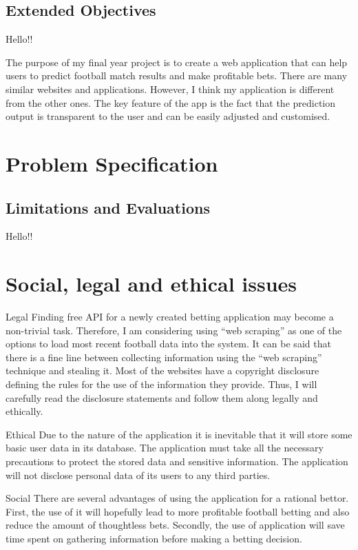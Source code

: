 \subsection{Extended Objectives}
\label{sec:extendedobjectives}
Hello!!


The purpose of my final year project is to create a web application that can help users to predict football match results and make profitable bets. There are many similar websites and applications. However, I think my application is different from the other ones. The key feature of the app is the fact that the prediction output is transparent to the user and can be easily adjusted and customised. 

\section{Problem Specification}
\label{sec:projscpec}


\subsection{Limitations and Evaluations}
\label{sec:limiteval}
Hello!!

\section{Social, legal and ethical issues}
Legal
Finding free API for a newly created betting application may become a non-trivial task. Therefore, I am considering using “web scraping” as one of the options to load most recent football data into the system. It can be said that there is a fine line between collecting information using the “web scraping” technique and stealing it. Most of the websites have a copyright disclosure defining the rules for the use of the information they provide. Thus, I will carefully read the disclosure statements and follow them along legally and ethically. 

Ethical
Due to the nature of the application it is inevitable that it will store some basic user data in its database. The application must take all the necessary precautions to protect the stored data and sensitive information. The application will not disclose personal data of its users to any third parties.

Social
There are several advantages of using the application for a rational bettor. First, the use of it will hopefully lead to more profitable football betting and also reduce the amount of thoughtless bets. Secondly, the use of application will save time spent on gathering information before making a betting decision.


